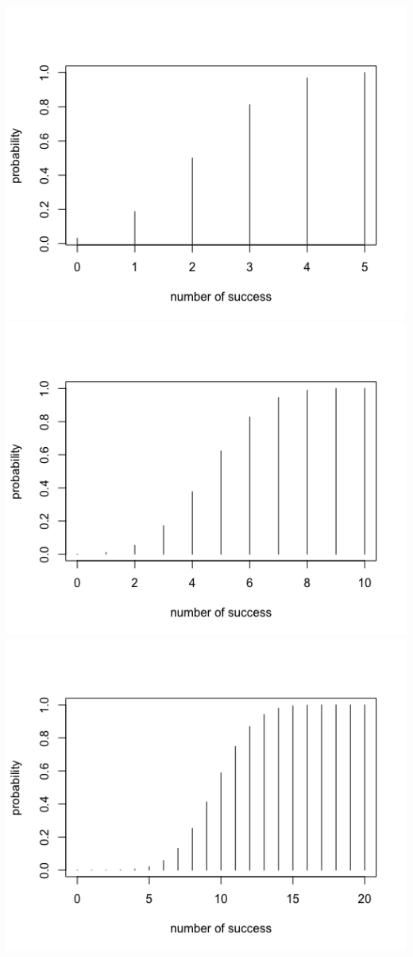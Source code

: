 \documentclass[11pt, oneside]{article}
\begin{document}
\begin{enumerate}
\begin{enumerate}
        \includegraphics[scale=0.3]{211}
        \includegraphics[scale=0.3]{212}
        \includegraphics[scale=0.3]{213}
        

\end{enumerate}
\end{enumerate}
\end{document}
